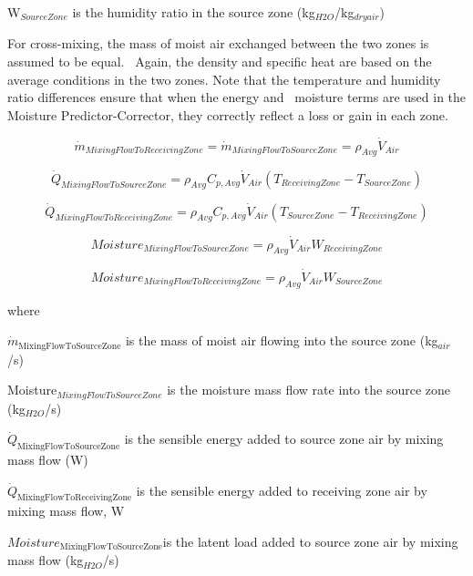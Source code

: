 W\(_{SourceZone}\) is the humidity ratio in the source zone (kg\(_{H2O}\)/kg\(_{dry air}\))

For cross-mixing, the mass of moist air exchanged between the two zones is assumed to be equal.~ Again, the density and specific heat are based on the average conditions in the two zones. Note that the temperature and humidity ratio differences ensure that when the energy and~ moisture terms are used in the Moisture Predictor-Corrector, they correctly reflect a loss or gain in each zone.

\begin{equation}
\dot{m}_{MixingFlowToReceivingZone} = \dot{m}_{MixingFlowToSourceZone} = \rho_{Avg}\dot{V}_{Air}
\end{equation}

\begin{equation}
\dot{Q}_{MixingFlowToSourceZone} = \rho_{Avg} C_{p,Avg} \dot{V}_{Air} \left( T_{ReceivingZone}-T_{SourceZone} \right)
\end{equation}

\begin{equation}
\dot{Q}_{MixingFlowToReceivingZone} = \rho_{Avg} C_{p,Avg} \dot{V}_{Air} \left( T_{SourceZone} - T_{ReceivingZone} \right)
\end{equation}

\begin{equation}
Moisture_{MixingFlowToSourceZone} = \rho_{Avg} \dot{V}_{Air} W_{ReceivingZone}
\end{equation}

\begin{equation}
Moisture_{MixingFlowToReceivingZone} = \rho_{Avg} \dot{V}_{Air} W_{SourceZone}
\end{equation}

where

\({\dot m_{{\mathrm{MixingFlowToSourceZone}}}}\) is the mass of moist air flowing into the source zone (kg\(_{air}\)/s)

Moisture\(_{MixingFlowToSourceZone}\) is the moisture mass flow rate into the source zone (kg\(_{H2O}\)/s)

\({\dot Q_{{\mathrm{MixingFlowToSourceZone}}}}\) is the sensible energy added to source zone air by mixing mass flow (W)

\({\dot Q_{{\mathrm{MixingFlowToReceivingZone}}}}\) is the sensible energy added to receiving zone air by mixing mass flow, W

\(Moistur{e_{{\mathrm{MixingFlowToSourceZone}}}}\)is the latent load added to source zone air by mixing mass flow (kg\(_{H2O}\)/s)

